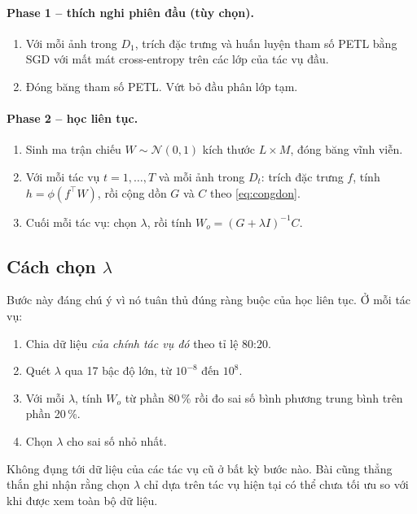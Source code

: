 \documentclass[11pt,a4paper]{article}
\begin{document}
\paragraph{Phase 1 -- thích nghi phiên đầu (tùy chọn).}
\begin{enumerate}[leftmargin=*]
\item Với mỗi ảnh trong $D_1$, trích đặc trưng và huấn luyện tham số PETL bằng
      SGD với mất mát cross-entropy trên các lớp của tác vụ đầu.
\item Đóng băng tham số PETL. Vứt bỏ đầu phân lớp tạm.
\end{enumerate}

\paragraph{Phase 2 -- học liên tục.}
\begin{enumerate}[leftmargin=*]
\item Sinh ma trận chiếu $W \sim \mathcal{N}(0,1)$ kích thước $L \times M$, đóng
      băng vĩnh viễn.
\item Với mỗi tác vụ $t = 1,\ldots,T$ và mỗi ảnh trong $D_t$: trích đặc trưng
      $f$, tính $h = \phi(f^{\top}W)$, rồi cộng dồn $G$ và $C$ theo
      \eqref{eq:congdon}.
\item Cuối mỗi tác vụ: chọn $\lambda$, rồi tính $W_o = (G + \lambda I)^{-1}C$.
\end{enumerate}

\subsection{Cách chọn \texorpdfstring{$\lambda$}{lambda}}

Bước này đáng chú ý vì nó tuân thủ đúng ràng buộc của học liên tục. Ở mỗi tác vụ:

\begin{enumerate}[leftmargin=*]
\item Chia dữ liệu \emph{của chính tác vụ đó} theo tỉ lệ 80:20.
\item Quét $\lambda$ qua 17 bậc độ lớn, từ $10^{-8}$ đến $10^{8}$.
\item Với mỗi $\lambda$, tính $W_o$ từ phần 80\,\% rồi đo sai số bình phương
      trung bình trên phần 20\,\%.
\item Chọn $\lambda$ cho sai số nhỏ nhất.
\end{enumerate}

Không đụng tới dữ liệu của các tác vụ cũ ở bất kỳ bước nào. Bài cũng thẳng thắn
ghi nhận rằng chọn $\lambda$ chỉ dựa trên tác vụ hiện tại có thể chưa tối ưu so
với khi được xem toàn bộ dữ liệu.
\end{document}

